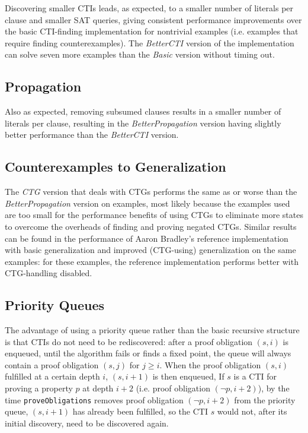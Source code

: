 \documentclass[12pt,a4paper,twoside,openright]{report}
\begin{document}
{Discovering smaller CTIs leads, as expected, to a smaller number of literals per clause and smaller SAT queries,
giving consistent performance improvements over the basic CTI-finding implementation for nontrivial
examples (i.e. examples that require finding counterexamples). The \emph{BetterCTI} version of the implementation
can solve seven more examples than the \emph{Basic} version without timing out.

\subsection{Propagation}

Also as expected, removing subsumed clauses results in a smaller number of literals per clause, resulting in
the \emph{BetterPropagation} version having slightly better performance than the \emph{BetterCTI} version.

\subsection{Counterexamples to Generalization}

The \emph{CTG} version that deals with CTGs performs the same as or worse than the \emph{BetterPropagation} version
on examples, most likely because the examples used are too small for the performance benefits of using CTGs to
eliminate more states to overcome the overheads of finding and proving negated CTGs. Similar results can be found
in the performance of Aaron Bradley's reference implementation with basic generalization and
improved (CTG-using) generalization on the same examples: for these examples, the reference implementation performs
better with CTG-handling disabled.

\subsection{Priority Queues}

The advantage of using a priority queue rather than the basic recursive structure is that CTIs do not need
to be rediscovered: after a proof obligation $(s,i)$ is enqueued, until the algorithm fails or finds a fixed point,
the queue will always contain a proof obligation $(s,j)$ for $j \geq i$. When the proof obligation $(s,i)$
fulfilled at a certain depth $i$, $(s,i + 1)$ is then enqueued, If $s$ is a CTI for proving a property
$p$ at depth $i + 2$ (i.e. proof obligation $(\neg p, i + 2)$), by the time \verb,proveObligations, removes
proof obligation $(\neg p, i + 2)$ from the priority queue, $(s, i+1)$ has already been fulfilled, so the
CTI $s$ would not, after its initial discovery, need to be discovered again.

}
\end{document}
